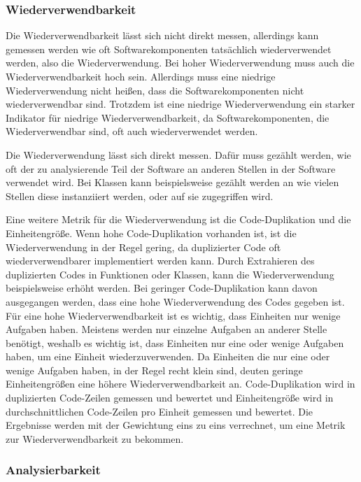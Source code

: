 \documentclass[12pt, a4paper, ngerman]{article}
\begin{document}
\subsubsection{Wiederverwendbarkeit}

Die Wiederverwendbarkeit lässt sich nicht direkt messen,
allerdings kann gemessen werden wie oft Softwarekomponenten
tatsächlich wiederverwendet werden, also die Wiederverwendung.
Bei hoher Wiederverwendung muss auch die Wiederverwendbarkeit hoch sein.
Allerdings muss eine niedrige Wiederverwendung nicht heißen,
dass die Softwarekomponenten nicht wiederverwendbar sind.
Trotzdem ist eine niedrige Wiederverwendung ein starker Indikator für niedrige Wiederverwendbarkeit,
da Softwarekomponenten, die Wiederverwendbar sind, oft auch wiederverwendet werden.

Die Wiederverwendung lässt sich direkt messen.
Dafür muss gezählt werden,
wie oft der zu analysierende Teil der Software
an anderen Stellen in der Software verwendet wird.
Bei Klassen kann beispielsweise gezählt werden an wie vielen Stellen diese instanziiert werden,
oder auf sie zugegriffen wird.

Eine weitere Metrik für die Wiederverwendung ist die Code-Duplikation und die Einheitengröße.
Wenn hohe Code-Duplikation vorhanden ist, ist die Wiederverwendung in der Regel gering,
da duplizierter Code oft wiederverwendbarer implementiert werden kann.
Durch Extrahieren des duplizierten Codes in Funktionen oder Klassen,
kann die Wiederverwendung beispielsweise erhöht werden.
Bei geringer Code-Duplikation kann davon ausgegangen werden,
dass eine hohe Wiederverwendung des Codes gegeben ist.
Für eine hohe Wiederverwendbarkeit ist es wichtig,
dass Einheiten nur wenige Aufgaben haben.
Meistens werden nur einzelne Aufgaben an anderer Stelle benötigt,
weshalb es wichtig ist, dass Einheiten nur eine oder wenige Aufgaben haben,
um eine Einheit wiederzuverwenden.
Da Einheiten die nur eine oder wenige Aufgaben haben, in der Regel recht klein sind,
deuten geringe Einheitengrößen eine höhere Wiederverwendbarkeit an.
Code-Duplikation wird in duplizierten Code-Zeilen gemessen und bewertet
und Einheitengröße wird in durchschnittlichen Code-Zeilen pro Einheit gemessen und bewertet.
Die Ergebnisse werden mit der Gewichtung eins zu eins verrechnet,
um eine Metrik zur Wiederverwendbarkeit zu bekommen.

\subsubsection{Analysierbarkeit}
\end{document}
